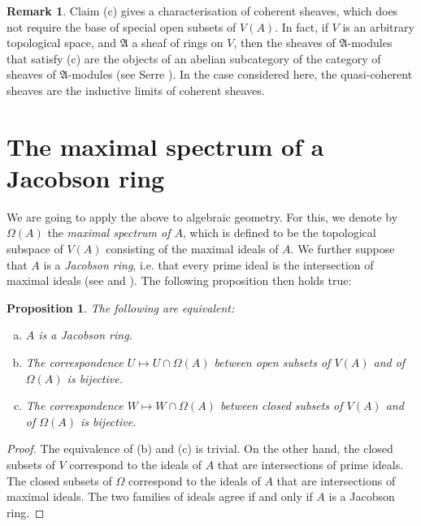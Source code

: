 \documentclass{article}
\theoremstyle{plain}
\newtheorem*{proposition}{Proposition}
\theoremstyle{definition}
\newtheorem*{remark}{Remark}
\newcommand{\oldpage}[1]{\marginpar{\footnotesize$\Big\vert$ \textit{p.~#1}}}
\begin{document}
\begin{remark}
\label{remark-theorem3}
\oldpage{1-11}
  Claim (c) gives a characterisation of coherent sheaves, which does not require the base of special open subsets of $V(A)$.
  In fact, if $V$ is an arbitrary topological space, and $\mathfrak{A}$ a sheaf of rings on $V$, then the sheaves of $\mathfrak{A}$-modules that satisfy (c) are the objects of an abelian subcategory of the category of sheaves of $\mathfrak{A}$-modules (see Serre \cite{4}).
  In the case considered here, the quasi-coherent sheaves are the inductive limits of coherent sheaves.
\end{remark}


\section{The maximal spectrum of a Jacobson ring}
\label{section5}

We are going to apply the above to algebraic geometry.
For this, we denote by $\Omega(A)$ the \emph{maximal spectrum of $A$}, which is defined to be the topological subspace of $V(A)$ consisting of the maximal ideals of $A$.
We further suppose that $A$ is a \emph{Jacobson ring}, i.e. that every prime ideal is the intersection of maximal ideals (see \cite{1} and \cite{3}).
The following proposition then holds true:

\begin{proposition}
  The following are equivalent:
  \begin{enumerate}[(a)]
    \item $A$ is a Jacobson ring.
    \item The correspondence $U\mapsto U\cap\Omega(A)$ between open subsets of $V(A)$ and of $\Omega(A)$ is bijective.
    \item The correspondence $W\mapsto W\cap\Omega(A)$ between closed subsets of $V(A)$ and of $\Omega(A)$ is bijective.
  \end{enumerate}
\end{proposition}

\begin{proof}
  The equivalence of (b) and (c) is trivial.
  On the other hand, the closed subsets of $V$ correspond to the ideals of $A$ that are intersections of prime ideals.
  The closed subsets of $\Omega$ correspond to the ideals of $A$ that are intersections of maximal ideals.
  The two families of ideals agree if and only if $A$ is a Jacobson ring.
\end{proof}
\end{document}
